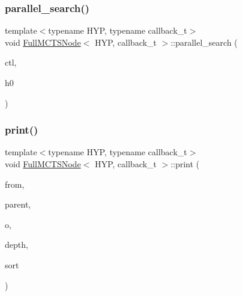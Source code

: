 \mbox{\label{class_full_m_c_t_s_node_a55ea8b152892f1da0c298e8af0df632f}} 
\subsubsection{\texorpdfstring{parallel\+\_\+search()}{parallel\_search()}}
{\footnotesize\ttfamily template$<$typename H\+YP, typename callback\+\_\+t$>$ \\
void \hyperlink{class_full_m_c_t_s_node}{Full\+M\+C\+T\+S\+Node}$<$ H\+YP, callback\+\_\+t $>$\+::parallel\+\_\+search (\begin{DoxyParamCaption}\item[{\hyperlink{struct_control}{Control}}]{ctl,  }\item[{H\+YP \&}]{h0 }\end{DoxyParamCaption})\hspace{0.3cm}{\ttfamily [inline]}}

\mbox{\label{class_full_m_c_t_s_node_ab12c625acd3e18a9f50b4491442f9a14}} 
\subsubsection{\texorpdfstring{print()}{print()}\hspace{0.1cm}{\footnotesize\ttfamily [1/3]}}
{\footnotesize\ttfamily template$<$typename H\+YP, typename callback\+\_\+t$>$ \\
void \hyperlink{class_full_m_c_t_s_node}{Full\+M\+C\+T\+S\+Node}$<$ H\+YP, callback\+\_\+t $>$\+::print (\begin{DoxyParamCaption}\item[{H\+YP}]{from,  }\item[{\hyperlink{class_full_m_c_t_s_node_afcc6a60f2d45fd1d6c4bd5f4998b147d}{this\+\_\+t} $\ast$}]{parent,  }\item[{std\+::ostream \&}]{o,  }\item[{const int}]{depth,  }\item[{const bool}]{sort }\end{DoxyParamCaption})\hspace{0.3cm}{\ttfamily [inline]}}

